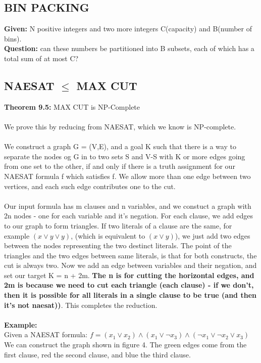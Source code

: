 \subsection{BIN PACKING}
\textbf{Given:} 
N positive integers and two more integers C(capacity) and B(number of bins).  \\
\textbf{Question:} can these numbers be partitioned into B subsets, each of which has a total sum of at most C?
\subsection{NAESAT $\le$ MAX CUT}
\textbf{Theorem 9.5:} MAX CUT is NP-Complete\\\\
We prove this by reducing from NAESAT, which we know is NP-complete.\\\\
We construct a graph G = (V,E), and a goal K such that there is a way to separate the nodes og G in to two sets S and V-S with K or more edges  going from one set to the other, if and only if there is a truth assignment for our NAESAT formula f which satisfies f. We allow more than one edge between two vertices, and each such edge contributes one to the cut. 
\\\\
Our input formula has m clauses and n variables, and we constuct a graph with 2n nodes - one for each variable and it's negation. For each clause, we add edges to our graph to form triangles. If two literals of a clause are the same, for example $(x \lor y \lor y)$, (which is equivalent to $(x \lor y)$), we just add two edges between the nodes representing the two destinct literals. The point of the triangles and the two edges between same literals, is that for both constructs, the cut is always two. Now we add an edge between variables and their negation, and set our target K = n + 2m. \textbf{The n is for cutting the horizontal edges, and 2m is because we need to cut each triangle (each clause) - if we don't, then it is possible for all literals in a single clause to be true (and then it's not naesat))}. This completes the reduction.\\\\
\textbf{Example:}\\
Given a NAESAT formula:  $f =  (x_1 \lor x_2) \land (x_1 \lor \lnot x_3) \land (\lnot x_1 \lor \lnot x_2 \lor x_3)$\\
We can construct the graph shown in figure 4. The green edges come from the first clause, red the second clause, and blue the third clause.\\
